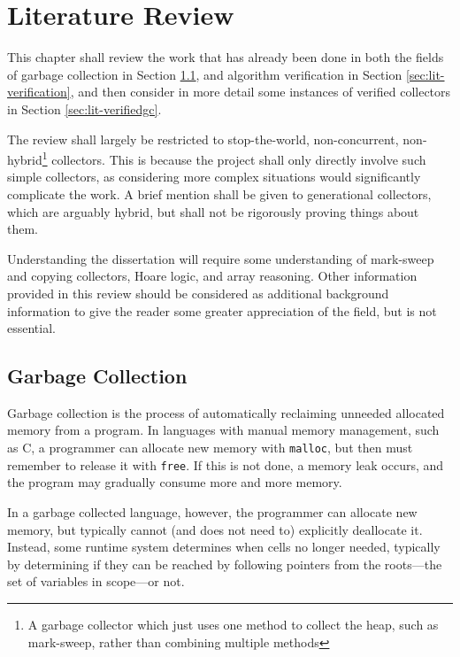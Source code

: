 \chapter{Literature Review}
\label{sec:lit}

This chapter shall review the work that has already been done in both
the fields of garbage collection in Section \ref{sec:lit-gc}, and
algorithm verification in Section \ref{sec:lit-verification}, and then
consider in more detail some instances of verified collectors in
Section \ref{sec:lit-verifiedgc}.

The review shall largely be restricted to stop-the-world,
non-concurrent, non-hybrid\footnote{A garbage collector which just
  uses one method to collect the heap, such as mark-sweep, rather than
  combining multiple methods} collectors. This is because the project
shall only directly involve such simple collectors, as considering
more complex situations would significantly complicate the work. A
brief mention shall be given to generational collectors, which are
arguably hybrid, but shall not be rigorously proving things about
them.

Understanding the dissertation will require some understanding of
mark-sweep and copying collectors, Hoare logic, and array
reasoning. Other information provided in this review should be
considered as additional background information to give the reader
some greater appreciation of the field, but is not essential.

\section{Garbage Collection}
\label{sec:lit-gc}

Garbage collection is the process of automatically reclaiming unneeded
allocated memory from a program\cite{McCarthy60}. In languages with
manual memory management, such as C, a programmer can allocate new
memory with \texttt{malloc}, but then must remember to release it with
\texttt{free}\cite{KandR}. If this is not done, a memory leak occurs,
and the program may gradually consume more and more
memory\cite{Barach82}.

In a garbage collected language, however, the programmer can allocate
new memory, but typically cannot (and does not need to) explicitly
deallocate it. Instead, some runtime system determines when cells no
longer needed, typically by determining if they can be reached by
following pointers from the roots---the set of variables in scope---or
not.

